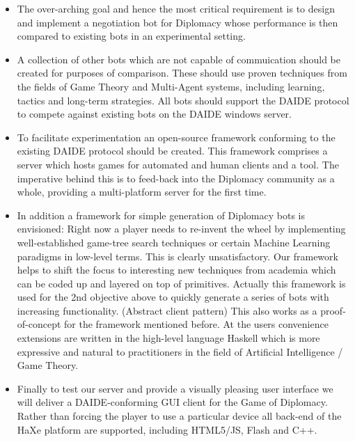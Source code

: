 \documentclass[11pt]{article}
\begin{document}
\begin{itemize}

\item The over-arching goal and hence the most critical requirement is to 
      design and implement a negotiation bot for Diplomacy whose performance
      is then compared to existing bots in an experimental setting. 
\item A collection of other bots which are not capable of commuication should
      be created for purposes of comparison. These should use proven techniques
      from the fields of Game Theory and Multi-Agent systems, including learning,
      tactics and long-term strategies. All bots should support the DAIDE 
      protocol to compete against existing bots on the DAIDE windows server.
\item To facilitate experimentation an open-source framework conforming to the
      existing DAIDE protocol should be created. This framework comprises a 
      server which hosts games for automated and human clients and a tool. The
      imperative behind this is to feed-back into the Diplomacy community as 
      a whole, providing a multi-platform server for the first time. 
\item In addition a framework for simple generation of Diplomacy bots is 
      envisioned: Right now a player needs to re-invent the wheel by 
      implementing well-established game-tree search techniques or certain
      Machine Learning paradigms in low-level terms. This is clearly 
      unsatisfactory. Our framework helps to shift the focus to interesting
      new techniques from academia which can be coded up and layered on top
      of primitives. Actually this framework is used for the 2nd objective above
      to quickly generate a series of bots with increasing functionality.
      (Abstract client pattern) This also works as a proof-of-concept for the
      framework mentioned before. At the users convenience extensions are
      written in the high-level language Haskell which is more expressive and
      natural to practitioners in the field of Artificial Intelligence / Game Theory.  
\item Finally to test our server and provide a visually pleasing user interface
      we will deliver a DAIDE-conforming GUI client for the Game of Diplomacy. 
      Rather than forcing the player to use a particular device all back-end
      of the HaXe platform are supported, including HTML5/JS, Flash and C++. 

\end{itemize}
\end{document}
